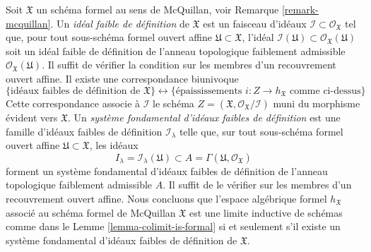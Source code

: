 \begin{remark}
\label{remark-weak-ideals-of-definition}
Soit $\mathfrak X$ un schéma formel au sens de McQuillan, voir
Remarque \ref{remark-mcquillan}. Un {\it idéal faible de définition}
de $\mathfrak X$ est un faisceau d'idéaux
$\mathcal{I} \subset \mathcal{O}_\mathfrak X$ tel que,
pour tout sous-schéma formel ouvert affine $\mathfrak U \subset \mathfrak X$,
l'idéal
$\mathcal{I}(\mathfrak U) \subset \mathcal{O}_\mathfrak X(\mathfrak U)$
soit un idéal faible de définition de l'anneau topologique faiblement admissible
$\mathcal{O}_\mathfrak X(\mathfrak U)$.
Il suffit de vérifier la condition sur les membres d'un recouvrement ouvert affine.
Il existe une correspondance biunivoque
$$
\{\text{idéaux faibles de définition de }\mathfrak X\}
\leftrightarrow
\{\text{épaississements }i : Z \to h_\mathfrak X\text{ comme ci-dessus}\}
$$
Cette correspondance associe à $\mathcal{I}$ le schéma
$Z = (\mathfrak X, \mathcal{O}_\mathfrak X/\mathcal{I})$
muni du morphisme évident vers $\mathfrak X$.
Un {\it système fondamental d'idéaux faibles de définition}
est une famille d'idéaux faibles de définition
$\mathcal{I}_\lambda$ telle que, sur tout sous-schéma formel ouvert
affine $\mathfrak U \subset \mathfrak X$, les
idéaux
$$
I_\lambda = \mathcal{I}_\lambda(\mathfrak U) \subset
A = \Gamma(\mathfrak U, \mathcal{O}_\mathfrak X)
$$
forment un système fondamental d'idéaux faibles de définition de
l'anneau topologique faiblement admissible $A$. Il suffit de le vérifier
sur les membres d'un recouvrement ouvert affine. Nous concluons que
l'espace algébrique formel $h_\mathfrak X$ associé au
schéma formel de McQuillan $\mathfrak X$ est une limite inductive de schémas comme
dans le Lemme \ref{lemma-colimit-is-formal} si et seulement s'il
existe un système fondamental d'idéaux faibles de définition
de $\mathfrak X$.
\end{remark}

